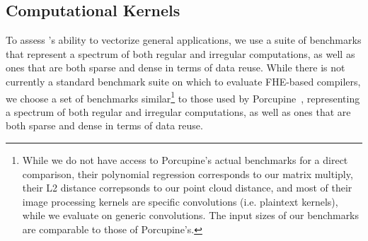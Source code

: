 \subsection{Computational Kernels}

To assess \system's ability to vectorize general applications, we use a suite of benchmarks that represent a spectrum of both regular and irregular computations, as well as ones that are both sparse and dense in terms of data reuse.
While there is not currently a standard benchmark suite on which to evaluate FHE-based compilers, we choose a set of benchmarks similar\footnote{While we do not have access to Porcupine's actual benchmarks for a direct comparison, their polynomial regression corresponds to our matrix multiply, their L2 distance correpsonds to our point cloud distance, and most of their image processing kernels are specific convolutions (i.e. plaintext kernels), while we evaluate on generic convolutions. The input sizes of our benchmarks are comparable to those of Porcupine's.} to those used by Porcupine~\cite{Porcupine}, representing a spectrum of both regular and irregular computations, as well as ones that are both sparse and dense in terms of data reuse.


